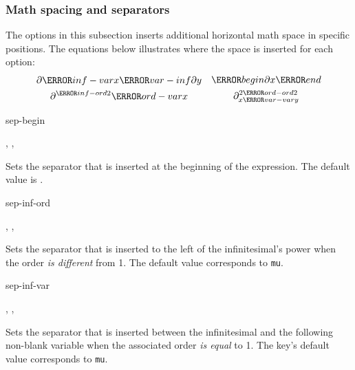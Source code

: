 \subsubsection*{Math spacing and separators}
The options in this subsection inserts additional horizontal math space in specific positions. The equations below illustrates where the space is inserted for each option:%
\begin{align*}
	\begin{gathered}
		\partial \ms{inf-var} x \ms{var-inf} \partial y \\
		\partial^{ \ms{inf-ord} 2 } \ms{ord-var} x
	\end{gathered}
	&&
	\begin{gathered}
		\ms{begin} \partial x \ms{end} \\
		\partial^{ 2\ms{ord-ord} 2 }_{ x \ms{var-var} y }
	\end{gathered}
\end{align*}

\begin{option}{sep-begin}
	\begin{values}[default = \cs{mathop}\{\}\cs{!}]
		, , 
	\end{values}
	Sets the separator that is inserted at the beginning of the expression. The default value is .
	\begin{example}
	\end{example}
\end{option}

\begin{option}{sep-inf-ord}
	\begin{values}[default = 0]
		, , \marg{delimiter}
	\end{values}
	Sets the separator that is inserted to the left of the infinitesimal's power when the order \emph{is different} from \num{1}. The default value corresponds to  \texttt{mu}.
	\begin{example}
		\odif[sep-inf-ord=\here, order=2]{x,y}
	\end{example}
\end{option}

\begin{option}{sep-inf-var}
	\begin{values}[default = 0]
		, , 
	\end{values}
	Sets the separator that is inserted between the infinitesimal and the following non-blank variable when the associated order \emph{is equal} to \num{1}. The key's default value corresponds to  \texttt{mu}.
	\begin{example}
		\odif[sep-inf-var=\here, order=2]{x,y}
	\end{example}
\end{option}


